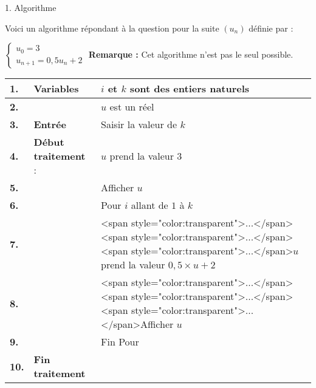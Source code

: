
%
\begin{h3}1. Algorithme\end{h3}
Voici un algorithme répondant à la question pour la suite $\left(u_{n}\right)$ définie par :
\par
$\left\{ \begin{matrix} u_{0}=3 \\ u_{n+1} = 0,5u_{n}+2\end{matrix}\right.$
     \textbf{Remarque : }Cet algorithme n'est pas le seul possible.
    \begin{tabularx}{0.8\linewidth}{|*{3}{>{\centering \arraybackslash }X|}}%
          \hline
          \textbf{ 1.} & \textbf{Variables}  &  	$i$ et $k$ sont des entiers naturels
          \\ \hline
          \textbf{ 2.} &  & $u$ est un réel
          \\ \hline
          \textbf{ 3.} & \textbf{Entrée}  & Saisir la valeur de $k$
          \\ \hline
          \textbf{ 4.} & \textbf{Début traitement} : &  	$u$ prend la valeur 3
          \\ \hline
          \textbf{ 5.} &  & Afficher $u$
               \\ \hline
               \textbf{ 6.} &   & Pour $i$ allant de $1$ à $k$
               \\ \hline
               \textbf{ 7.} &  & <span style="color:transparent">...</span><span style="color:transparent">...</span><span style="color:transparent">...</span>$u$ prend la valeur $0,5\times u+2$
               \\ \hline
               \textbf{ 8.} &  & <span style="color:transparent">...</span><span style="color:transparent">...</span><span style="color:transparent">...</span>Afficher $u$
               \\ \hline
               \textbf{ 9.} &  &  Fin Pour
               \\ \hline
               \textbf{10.} & \textbf{Fin traitement}  &
               \\ \hline
          \end{tabularx}
